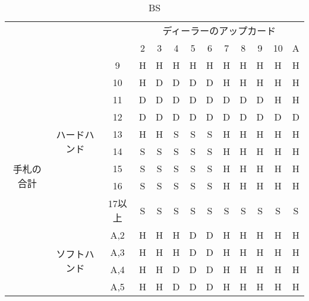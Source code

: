 \begin{table}[H]
    \begin{center}
    \caption{BS}
    \begin{tabular}{|c|c|c|c|c|c|c|c|c|c|c|c|c|}
    \hline
    \multicolumn{3}{|c|}{\multirow{2}{*}{}}                     & \multicolumn{10}{c|}{ディーラーのアップカード}     \\ \cline{4-13} 
    \multicolumn{3}{|c|}{}                                      & 2 & 3 & 4 & 5 & 6 & 7 & 8 & 9 & 10 & A \\ \hline
    \multirow{28}{*}{手札の合計} & \multirow{9}{*}{ハードハンド}   & 9     & H & H & H & H & H & H & H & H & H  & H \\ \cline{3-13} 
                            &                           & 10    & H & D & D & D & D & H & H & H & H  & H \\ \cline{3-13} 
                            &                           & 11    & D & D & D & D & D & D & D & D & H  & H \\ \cline{3-13} 
                            &                           & 12    & D & D & D & D & D & D & D & D & D  & D \\ \cline{3-13} 
                            &                           & 13    & H & H & S & S & S & H & H & H & H  & H \\ \cline{3-13} 
                            &                           & 14    & S & S & S & S & S & H & H & H & H  & H \\ \cline{3-13} 
                            &                           & 15    & S & S & S & S & S & H & H & H & H  & H \\ \cline{3-13} 
                            &                           & 16    & S & S & S & S & S & H & H & H & H  & H \\ \cline{3-13} 
                            &                           & 17以上  & S & S & S & S & S & S & S & S & S  & S \\ \cline{2-13} 
                            & \multirow{9}{*}{ソフトハンド}   & A,2   & H & H & H & D & D & H & H & H & H  & H \\ \cline{3-13} 
                            &                           & A,3   & H & H & H & D & D & H & H & H & H  & H \\ \cline{3-13} 
                            &                           & A,4   & H & H & D & D & D & H & H & H & H  & H \\ \cline{3-13} 
                            &                           & A,5   & H & H & D & D & D & H & H & H & H  & H \\ \cline{3-13} 

\end{tabular}
\end{center}
\end{table}
